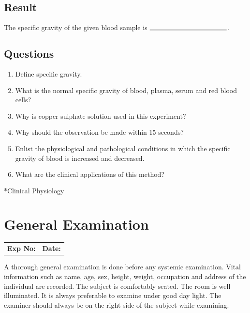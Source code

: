 \documentclass[a4paper,12pt,openany,oneside]{book}
\makeatletter
\renewcommand\part{%
       \if@openright
         \cleardoublepage
       \else
         \clearpage
       \fi
       \thispagestyle{empty}%
       \if@twocolumn
         \onecolumn
         \@tempswatrue
       \else
         \@tempswafalse
       \fi
       \null\vfil
       \secdef\@part\@spart}
\makeatother
\begin{document}
															\section*{Result}
															The specific gravity of the given blood sample is $\rule{4cm}{.5pt}$.
															\section*{Questions}
															\begin{enumerate}
																\item{Define specific gravity.}
																\item{What is the normal specific gravity of blood, plasma, serum and red blood cells?}
																\item{Why is copper sulphate solution used in this experiment?}
																\item{Why should the observation be made within 15 seconds?}
																\item{Enlist the physiological and pathological conditions in which the specific gravity of blood is increased and decreased.}
																\item{What are the clinical applications of this method? }
															\end{enumerate}
															\part*{Clinical Physiology}
															\chapter*{\centering General Examination}

															\begin{tabular}{p{5in} p{1in}}
																\textbf{Exp No:}  & \textbf{Date:}\\
															\end{tabular}
															A thorough general examination is done before any systemic examination. Vital information such as name, age, sex, height, weight, occupation and address of the individual are recorded. The subject is comfortably seated. The room is well illuminated. It is always preferable to examine under good day light. The examiner should always be on the right side of the subject while examining.
\end{document}
